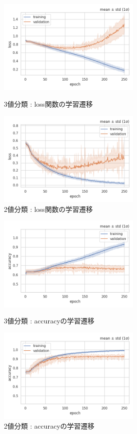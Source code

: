 \documentclass[a4j, 11pt]{jreport}
\begin{document}
\begin{figure}[htbp]
  \begin{minipage}[b]{0.45\hsize}
    \centering
    \includegraphics[keepaspectratio, width=7cm]{images/losses_ex4-1.png}
    \caption{3値分類 : loss関数の学習遷移}
		\label{fig:losses_ex4-1}
  \end{minipage}
  \begin{minipage}[b]{0.45\hsize}
    \centering
    \includegraphics[keepaspectratio, width=7cm]{images/losses_ex4-2.png}
    \caption{2値分類 : loss関数の学習遷移}
		\label{fig:losses_ex4-2}
  \end{minipage}
\end{figure}

\begin{figure}[htbp]
  \begin{minipage}[b]{0.45\hsize}
    \centering
    \includegraphics[keepaspectratio, width=7cm]{images/accs_ex4-1.png}
    \caption{3値分類 : accuracyの学習遷移}
		\label{fig:accs_ex4-1}
  \end{minipage}
  \begin{minipage}[b]{0.45\hsize}
    \centering
    \includegraphics[keepaspectratio, width=7cm]{images/accs_ex4-2.png}
    \caption{2値分類 : accuracyの学習遷移}
		\label{fig:accs_ex4-2}
  \end{minipage}
\end{figure}
\end{document}
